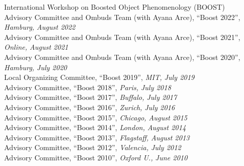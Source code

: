 \item International Workshop on Boosted Object Phenomenology (BOOST)
\\ Advisory Committee and Ombuds Team (with Ayana Arce), ``Boost 2022'', \emph{Hamburg, }\emph{August 2022}
\\ Advisory Committee and Ombuds Team (with Ayana Arce), ``Boost 2021'', \emph{Online, }\emph{August 2021}
\\ Advisory Committee and Ombuds Team (with Ayana Arce), ``Boost 2020'', \emph{Hamburg, }\emph{July 2020}
\\ Local Organizing Committee, ``Boost 2019'', \emph{MIT, }\emph{July 2019}
\\ Advisory Committee, ``Boost 2018'', \emph{Paris, }\emph{July 2018}
\\ Advisory Committee, ``Boost 2017'', \emph{Buffalo, }\emph{July 2017}
\\ Advisory Committee, ``Boost 2016'', \emph{Zurich, }\emph{July 2016}
\\ Advisory Committee, ``Boost 2015'', \emph{Chicago, }\emph{August 2015}
\\ Advisory Committee, ``Boost 2014'', \emph{London, }\emph{August 2014}
\\ Advisory Committee, ``Boost 2013'', \emph{Flagstaff, }\emph{August 2013}
\\ Advisory Committee, ``Boost 2012'', \emph{Valencia, }\emph{July 2012}
\\ Advisory Committee, ``Boost 2010'', \emph{Oxford U., }\emph{June 2010}
